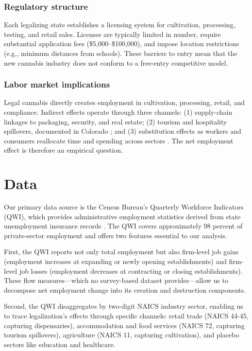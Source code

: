 \documentclass[12pt]{article}
\begin{document}
\subsubsection*{Regulatory structure} Each legalizing state establishes a licensing system for cultivation, processing, testing, and retail sales. Licenses are typically limited in number, require substantial application fees (\$5,000--\$100,000), and impose location restrictions (e.g., minimum distances from schools). These barriers to entry mean that the new cannabis industry does not conform to a free-entry competitive model.

\subsubsection*{Labor market implications} Legal cannabis directly creates employment in cultivation, processing, retail, and compliance. Indirect effects operate through three channels: (1) supply-chain linkages to packaging, security, and real estate; (2) tourism and hospitality spillovers, documented in Colorado \citep{chakraborty2021}; and (3) substitution effects as workers and consumers reallocate time and spending across sectors \citep{anderson2013}. The net employment effect is therefore an empirical question.

\section{Data}

Our primary data source is the Census Bureau's Quarterly Workforce Indicators (QWI), which provides administrative employment statistics derived from state unemployment insurance records \citep{census_qwi}. The QWI covers approximately 98 percent of private-sector employment and offers two features essential to our analysis.

First, the QWI reports not only total employment but also firm-level job gains (employment increases at expanding or newly opening establishments) and firm-level job losses (employment decreases at contracting or closing establishments). These flow measures---which no survey-based dataset provides---allow us to decompose net employment change into its creation and destruction components.

Second, the QWI disaggregates by two-digit NAICS industry sector, enabling us to trace legalization's effects through specific channels: retail trade (NAICS 44-45, capturing dispensaries), accommodation and food services (NAICS 72, capturing tourism spillovers), agriculture (NAICS 11, capturing cultivation), and placebo sectors like education and healthcare.
\end{document}
